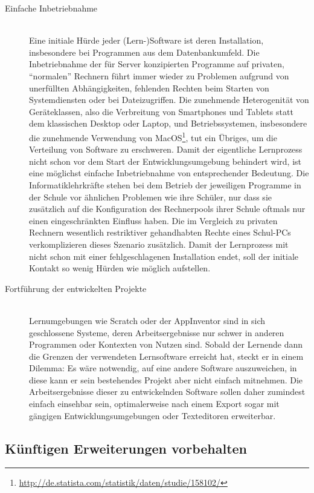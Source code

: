\begin{description}
\item[Einfache Inbetriebnahme] \hfill \\
  Eine initiale Hürde jeder (Lern-)Software ist deren Installation, insbesondere bei Programmen aus dem Datenbankumfeld. Die Inbetriebnahme der für Server konzipierten Programme auf privaten, "`normalen"' Rechnern führt immer wieder zu Problemen aufgrund von unerfüllten Abhängigkeiten, fehlenden Rechten beim Starten von Systemdiensten oder bei Dateizugriffen. Die zunehmende Heterogenität von Geräteklassen, also die Verbreitung von Smartphones und Tablets statt dem klassischen Desktop oder Laptop, und Betriebssystemen, insbesondere die zunehmende Verwendung von MacOS\footnote{\url{http://de.statista.com/statistik/daten/studie/158102/}}, tut ein Übriges, um die Verteilung von Software zu erschweren. Damit der eigentliche Lernprozess nicht schon vor dem Start der Entwicklungsumgebung behindert wird, ist eine möglichst einfache Inbetriebnahme von entsprechender Bedeutung. Die Informatiklehrkräfte stehen bei dem Betrieb der jeweiligen Programme in der Schule vor ähnlichen Problemen wie ihre Schüler, nur dass sie zusätzlich auf die Konfiguration des Rechnerpools ihrer Schule oftmals nur einen eingeschränkten Einfluss haben. Die im Vergleich zu privaten Rechnern wesentlich restriktiver gehandhabten Rechte eines Schul-PCs verkomplizieren dieses Szenario zusätzlich. Damit der Lernprozess mit \idename{} nicht schon mit einer fehlgeschlagenen Installation endet, soll der initiale Kontakt so wenig Hürden wie möglich aufstellen.
\item[Fortführung der entwickelten Projekte] \hfill \\
  Lernumgebungen wie Scratch oder der AppInventor sind in sich geschlossene Systeme, deren Arbeitsergebnisse nur schwer in anderen Programmen oder Kontexten von Nutzen sind. Sobald der Lernende dann die Grenzen der verwendeten Lernsoftware erreicht hat, steckt er in einem Dilemma: Es wäre notwendig, auf eine andere Software auszuweichen, in diese kann er sein bestehendes Projekt aber nicht einfach mitnehmen. Die Arbeitsergebnisse dieser zu entwickelnden Software sollen daher zumindest einfach einsehbar sein, optimalerweise nach einem Export sogar mit gängigen Entwicklungsumgebungen oder Texteditoren erweiterbar.
\end{description}

\subsection{Künftigen Erweiterungen vorbehalten}
\label{sec:out-of-scope}

